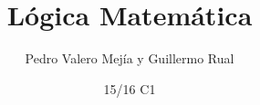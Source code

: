 \documentclass[nochap]{apuntes}
\title{Lógica Matemática}
\author{Pedro Valero Mejía y Guillermo Rual}
\date{15/16 C1}
\begin{document}
\pagestyle{plain}
\maketitle

\tableofcontents
\newpage

\newpage

\newpage

\newpage



\appendix











\nocite{dries,halmos}
{}

\printindex
\end{document}
